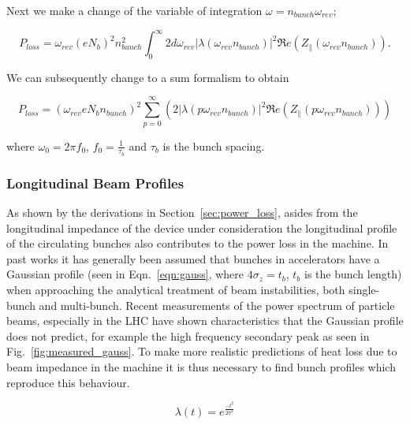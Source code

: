Next we make a change of the variable of integration $\omega = n_{bunch}\omega_{rev}$;

\begin{equation}
P_{loss}   =  \omega_{rev} \left( eN_{b}   \right)^{2}n_{bunch}^{2} \int^{\infty}_{0} 2 d\omega_{rev} \left| \lambda \left( \omega_{rev}n_{bunch} \right)  \right|^{2}  \Re{}e \left( Z_{\parallel} \left( \omega_{rev}n_{bunch}\right)  \right).
\end{equation}

We can subsequently change to a sum formalism to obtain

\begin{equation}
P_{loss} = \left( \omega_{rev}eN_{b}n_{bunch}  \right)^{2} \displaystyle\sum\limits_{p = 0}^{\infty} \left( 2 \left| \lambda \left(p \omega_{rev}n_{bunch} \right)  \right|^{2}  \Re{}e \left( Z_{\parallel} \left(p \omega_{rev}n_{bunch}\right) \right) \right) \label{ean:heating-gen}
\end{equation}

where $\omega_{0} = 2\pi f_{0}$, $f_{0} = \frac{1}{\tau_{b}}$ and $\tau_{b}$ is the bunch spacing.

\subsubsection{Longitudinal Beam Profiles}

As shown by the derivations in Section~\ref{sec:power_loss}, asides from the longitudinal impedance of the device under consideration the longitudinal profile of the circulating bunches also contributes to the power loss in the machine. In past works it has generally been assumed that bunches in accelerators have a Gaussian profile \cite{Grudiev:LongTransSecCol} (seen in Eqn.~\ref{eqn:gauss}, where $4\sigma_{z} = t_{b}$, $t_{b}$ is the bunch length) when approaching the analytical treatment of beam instabilities, both single-bunch and multi-bunch. Recent measurements of the power spectrum of particle beams, especially in the LHC \cite{Baudrenghien:LHCPowSpec} have shown characteristics that the Gaussian profile does not predict, for example the high frequency secondary peak as seen in Fig.~\ref{fig:measured_gauss}. To make more realistic predictions of heat loss due to beam impedance in the machine it is thus necessary to find bunch profiles which reproduce this behaviour.

\begin{equation}
\lambda \left( t \right) = e^{\frac{-t^{2}}{2\sigma^{2}}}
\label{eqn:gauss}
\end{equation}


